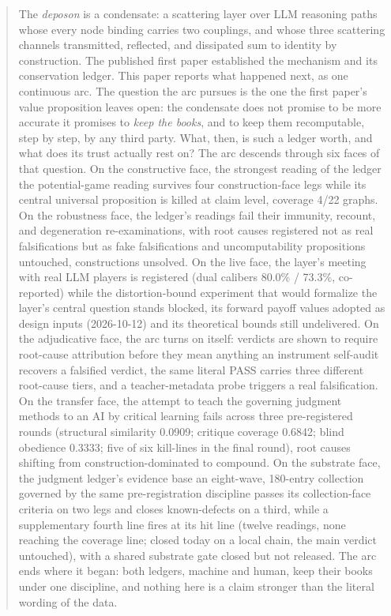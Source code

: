 \documentclass[11pt,letterpaper]{article}
\begin{document}
\begin{CJK}{UTF8}{gbsn}
\begin{abstract}
The \emph{deposon} is a condensate: a scattering layer over LLM reasoning paths whose every node binding carries two couplings, and whose three scattering channels \textemdash{} transmitted, reflected, and dissipated \textemdash{} sum to identity by construction. The published first paper established the mechanism and its conservation ledger. This paper reports what happened next, as one continuous arc. The question the arc pursues is the one the first paper's value proposition leaves open: the condensate does not promise to be more accurate \textemdash{} it promises to \emph{keep the books}, and to keep them recomputable, step by step, by any third party. What, then, is such a ledger worth, and what does its trust actually rest on? The arc descends through six faces of that question. On the constructive face, the strongest reading of the ledger \textemdash{} the potential-game reading \textemdash{} survives four construction-face legs while its central universal proposition is killed at claim level, coverage 4/22 graphs. On the robustness face, the ledger's readings fail their immunity, recount, and degeneration re-examinations, with root causes registered not as real falsifications but as fake falsifications and uncomputability \textemdash{} propositions untouched, constructions unsolved. On the live face, the layer's meeting with real LLM players is registered (dual calibers 80.0\% / 73.3\%, co-reported) while the distortion-bound experiment that would formalize the layer's central question stands blocked, its forward payoff values adopted as design inputs (2026-10-12) and its theoretical bounds still undelivered. On the adjudicative face, the arc turns on itself: verdicts are shown to require root-cause attribution before they mean anything \textemdash{} an instrument self-audit recovers a falsified verdict, the same literal PASS carries three different root-cause tiers, and a teacher-metadata probe triggers a real falsification. On the transfer face, the attempt to teach the governing judgment methods to an AI by critical learning fails across three pre-registered rounds (structural similarity 0.0909; critique coverage 0.6842; blind obedience 0.3333; five of six kill-lines in the final round), root causes shifting from construction-dominated to compound. On the substrate face, the judgment ledger's evidence base \textemdash{} an eight-wave, 180-entry collection governed by the same pre-registration discipline \textemdash{} passes its collection-face criteria on two legs and closes known-defects on a third, while a supplementary fourth line fires at its hit line (twelve readings, none reaching the coverage line; closed today on a local chain, the main verdict untouched), with a shared substrate gate closed but not released. The arc ends where it began: both ledgers, machine and human, keep their books under one discipline, and nothing here is a claim stronger than the literal wording of the data.


\end{abstract}
\end{CJK}
\end{document}
